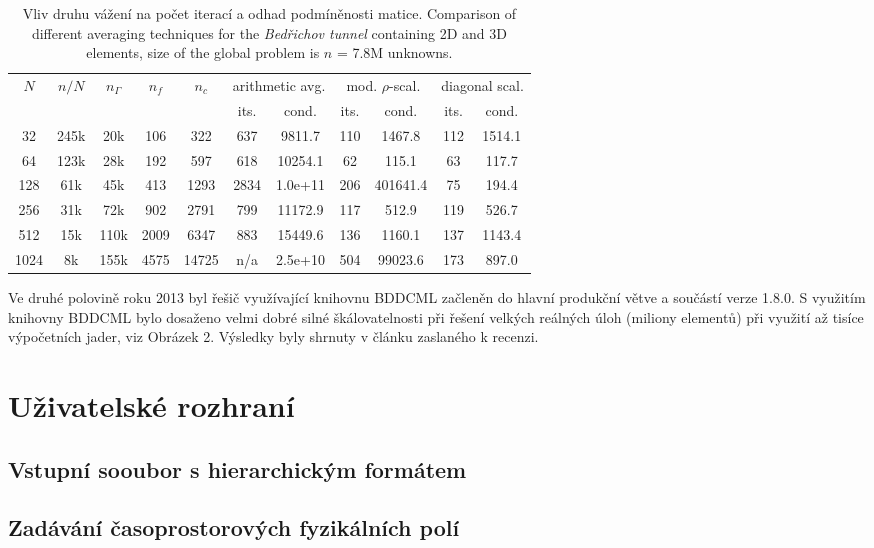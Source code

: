 \documentclass[11pt]{report}
\begin{document}
\begin{table}[ptbh]
\begin{center}
\begin{tabular}
[c]{|cc|ccc|cc|cc|cc|}\hline
\multirow{2}{*}{$N$} & \multirow{2}{*}{$n/N$} &
\multirow{2}{*}{$n_{\Gamma}$} & \multirow{2}{*}{$n_f$} &
\multirow{2}{*}{$n_c$} & \multicolumn{2}{c|}{arithmetic avg.} &
\multicolumn{2}{c|}{mod. $\rho$-scal.} & \multicolumn{2}{c|}{diagonal scal.}\\
&  &  &  &  & its. & cond. & its. & cond. & its. & cond.\\\hline
32 & 245k & 20k & 106 & 322 & 637 & 9811.7 & 110 & 1467.8 & 112 & 1514.1\\
64 & 123k & 28k & 192 & 597 & 618 & 10254.1 & 62 & 115.1 & 63 & 117.7\\
128 & 61k & 45k & 413 & 1293 & 2834 & 1.0e+11 & 206 & 401641.4 & 75 & 194.4\\
256 & 31k & 72k & 902 & 2791 & 799 & 11172.9 & 117 & 512.9 & 119 & 526.7\\
512 & 15k & 110k & 2009 & 6347 & 883 & 15449.6 & 136 & 1160.1 & 137 & 1143.4\\
1024 & 8k & 155k & 4575 & 14725 & n/a & 2.5e+10 & 504 & 99023.6 & 173 &
897.0\\\hline
\end{tabular}
\end{center}
\caption{\label{tab:tunnel_averaging}
Vliv druhu vážení na počet iterací a odhad podmíněnosti matice.
Comparison of 
different averaging techniques for the
\emph{Bed\v{r}ichov tunnel} containing 2D and 3D elements, size of the global
problem is $n$ = 7.8M unknowns.}
\end{table}

Ve druhé polovině roku 2013 byl řešič využívající knihovnu BDDCML začleněn do 
hlavní produkční větve a součástí verze 1.8.0. S využitím knihovny BDDCML bylo 
dosaženo velmi dobré silné škálovatelnosti při řešení velkých reálných úloh 
(miliony elementů) při využití až tisíce výpočetních jader, viz Obrázek 2. 
Výsledky byly shrnuty v článku \cite{SistekBDDC} zaslaného k recenzi. 

\section{Uživatelské rozhraní}
\subsection{Vstupní sooubor s hierarchickým formátem}
\subsection{Zadávání časoprostorových fyzikálních polí}
\end{document}
